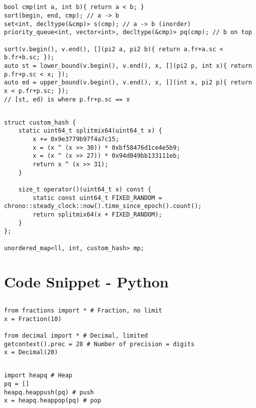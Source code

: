 \documentclass[landscape, 8pt, a4paper, oneside, twocolumn]{extarticle}
\begin{document}
\subsection{}
\begin{verbatim}
bool cmp(int a, int b){ return a < b; }
sort(begin, end, cmp); // a -> b
set<int, decltype(&cmp)> s(cmp); // a -> b (inorder)
priority_queue<int, vector<int>, decltype(&cmp)> pq(cmp); // b on top

sort(v.begin(), v.end(), [](pi2 a, pi2 b){ return a.fr+a.sc < b.fr+b.sc; });
auto st = lower_bound(v.begin(), v.end(), x, [](pi2 p, int x){ return p.fr+p.sc < x; });
auto ed = upper_bound(v.begin(), v.end(), x, [](int x, pi2 p){ return x < p.fr+p.sc; });
// [st, ed) is where p.fr+p.sc == x
\end{verbatim}
\subsection{}
\begin{verbatim}
struct custom_hash {
    static uint64_t splitmix64(uint64_t x) {
        x += 0x9e3779b97f4a7c15;
        x = (x ^ (x >> 30)) * 0xbf58476d1ce4e5b9;
        x = (x ^ (x >> 27)) * 0x94d049bb133111eb;
        return x ^ (x >> 31);
    }

    size_t operator()(uint64_t x) const {
        static const uint64_t FIXED_RANDOM = chrono::steady_clock::now().time_since_epoch().count();
        return splitmix64(x + FIXED_RANDOM);
    }
};

unordered_map<ll, int, custom_hash> mp;
\end{verbatim}
\section{Code Snippet - Python}
\subsection{}
\begin{verbatim}
from fractions import * # Fraction, no limit
x = Fraction(10)

from decimal import * # Decimal, limited
getcontext().prec = 28 # Number of precision = digits
x = Decimal(20)
\end{verbatim}
\subsection{}
\begin{verbatim}
import heapq # Heap
pq = []
heapq.heappush(pq) # push
x = heapq.heappop(pq) # pop
\end{verbatim}
\end{document}
